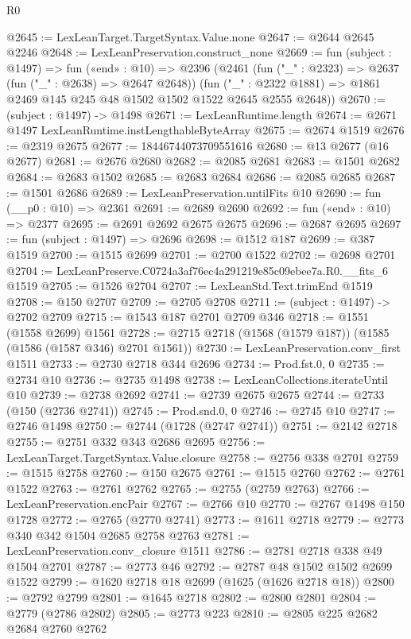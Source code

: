 \begin{lexlean}{R0}
\begin{coremodule}
@2645 := LexLeanTarget.TargetSyntax.Value.none
@2647 := @2644 @2645 @2246
@2648 := LexLeanPreservation.construct_none
@2669 := fun (subject : @1497) =>
  fun («end» : @10) =>
  @2396
    (@2461
      (fun ("_" : @2323) => @2637 (fun ("_" : @2638) => @2647 @2648))
      (fun ("_" : @2322 @1881) => @1861 @2469 @145 @245 @48 @1502 @1502 @1522 @2645 @2555 @2648))
@2670 := (subject : @1497) -> @1498
@2671 := LexLeanRuntime.length
@2674 := @2671 @1497 LexLeanRuntime.instLengthableByteArray
@2675 := @2674 @1519
@2676 := @2319 @2675
@2677 := 18446744073709551616
@2680 := @13 @2677 (@16 @2677)
@2681 := @2676 @2680
@2682 := @2085 @2681
@2683 := @1501 @2682
@2684 := @2683 @1502
@2685 := @2683 @2684
@2686 := @2085 @2685
@2687 := @1501 @2686
@2689 := LexLeanPreservation.untilFits @10
@2690 := fun (__p0 : @10) => @2361
@2691 := @2689 @2690
@2692 := fun («end» : @10) => @2377
@2695 := @2691 @2692 @2675 @2675
@2696 := @2687 @2695
@2697 := fun (subject : @1497) => @2696
@2698 := @1512 @187
@2699 := @387 @1519
@2700 := @1515 @2699
@2701 := @2700 @1522
@2702 := @2698 @2701
@2704 := LexLeanPreserve.C0724a3af76ec4a291219e85c09ebee7a.R0.__fits_6 @1519
@2705 := @1526 @2704
@2707 := LexLeanStd.Text.trimEnd @1519
@2708 := @150 @2707
@2709 := @2705 @2708
@2711 := (subject : @1497) -> @2702 @2709
@2715 := @1543 @187 @2701 @2709 @346
@2718 := @1551 (@1558 @2699) @1561
@2728 := @2715 @2718 (@1568 (@1579 @187)) (@1585 (@1586 (@1587 @346) @2701 @1561))
@2730 := LexLeanPreservation.conv_first @1511
@2733 := @2730 @2718 @344 @2696
@2734 := Prod.fst.{0, 0}
@2735 := @2734 @10
@2736 := @2735 @1498
@2738 := LexLeanCollections.iterateUntil @10
@2739 := @2738 @2692
@2741 := @2739 @2675 @2675
@2744 := @2733 (@150 (@2736 @2741))
@2745 := Prod.snd.{0, 0}
@2746 := @2745 @10
@2747 := @2746 @1498
@2750 := @2744 (@1728 (@2747 @2741))
@2751 := @2142 @2718
@2755 := @2751 @332 @343 @2686 @2695
@2756 := LexLeanTarget.TargetSyntax.Value.closure
@2758 := @2756 @338 @2701
@2759 := @1515 @2758
@2760 := @150 @2675
@2761 := @1515 @2760
@2762 := @2761 @1522
@2763 := @2761 @2762
@2765 := @2755 (@2759 @2763)
@2766 := LexLeanPreservation.encPair
@2767 := @2766 @10
@2770 := @2767 @1498 @150 @1728
@2772 := @2765 (@2770 @2741)
@2773 := @1611 @2718
@2779 := @2773 @340 @342 @1504 @2685 @2758 @2763
@2781 := LexLeanPreservation.conv_closure @1511
@2786 := @2781 @2718 @338 @49 @1504 @2701
@2787 := @2773 @46
@2792 := @2787 @48 @1502 @1502 @2699 @1522
@2799 := @1620 @2718 @18 @2699 (@1625 (@1626 @2718 @18))
@2800 := @2792 @2799
@2801 := @1645 @2718
@2802 := @2800 @2801
@2804 := @2779 (@2786 @2802)
@2805 := @2773 @223
@2810 := @2805 @225 @2682 @2684 @2760 @2762

\end{coremodule}
\end{lexlean}

